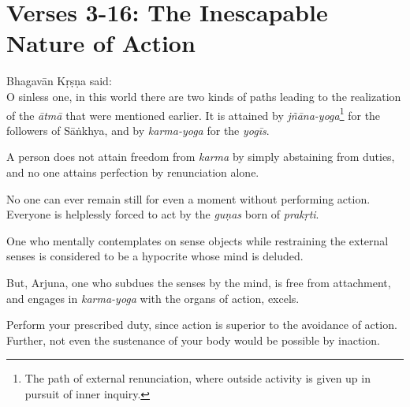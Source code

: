 \section{Verses 3-16: The Inescapable Nature of Action}\label{sec-verses-3-16-the-inescapable-nature-of-action}
{\hspace*{1em}Bhagavān Kṛṣṇa said: \\
O sinless one, in this world there are two kinds of paths leading to the realization of the \textit{ātmā} that were mentioned earlier. It is attained by \textit{jñāna-yoga}\footnote{The path of external renunciation, where outside activity is given up in pursuit of inner inquiry.} for the followers of Sāṅkhya, and by \textit{karma-yoga} for the \textit{yogīs}.}

{A person does not attain freedom from \textit{karma} by simply abstaining from duties, and no one attains perfection by renunciation alone.}

{No one can ever remain still for even a moment without performing action. Everyone is helplessly forced to act by the \textit{guṇas} born of \textit{prakṛti}.}

{One who mentally contemplates on sense objects while restraining the external senses is considered to be a hypocrite whose mind is deluded.}

{But, Arjuna, one who subdues the senses by the mind, is free from attachment, and engages in \textit{karma-yoga} with the organs of action, excels.}

{Perform your prescribed duty, since action is superior to the avoidance of action. Further, not even the sustenance of your body would be possible by inaction.}

